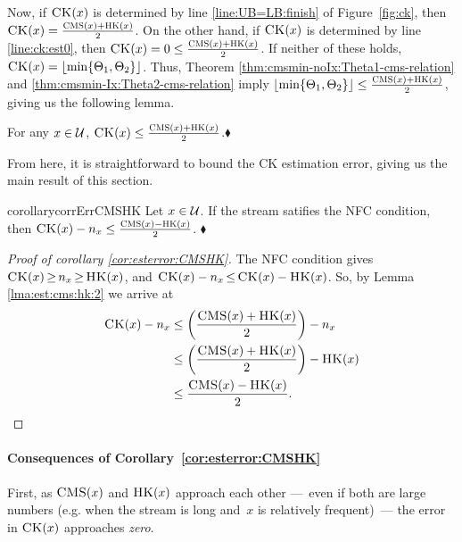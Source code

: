 \noindent
Now, if $\textnormal{\textsc{CK}}(x)$ is determined by line \ref{line:UB=LB:finish} of Figure~\ref{fig:ck}, then $\textnormal{\textsc{CK}}(x) = \frac{\textnormal{\textsc{CMS}}(x) + \textnormal{\textsc{HK}}(x)}{2}$.  On the other hand, if $\textnormal{\textsc{CK}}(x)$ is determined by line \ref{line:ck:est0}, then
$\textnormal{\textsc{CK}}(x)= 0 \leq \frac{\textnormal{\textsc{CMS}}(x) + \textnormal{\textsc{HK}}(x)}{2}$.  If neither of these holds, $\CK(x)=\floor(\min \{\Theta_1, \Theta_2\})$. Thus, Theorem \ref{thm:cmsmin-noIx:Theta1-cms-relation} and \ref{thm:cmsmin-Ix:Theta2-cms-relation} imply 
$\floor(\min \{\Theta_1, \Theta_2\}) \leq \frac{\CMS(x) + \HK(x)}{2}$, giving us the following lemma.
\begin{lemma}\label{lma:est:cms:hk:2}For any $x \in \mathcal{U}$, $\textnormal{\textsc{CK}}(x) \leq \frac{\textnormal{\textsc{CMS}}(x) + \textnormal{\textsc{HK}}(x)}{2}$.\hfill$\blacklozenge$
\end{lemma}

\noindent
From here, it is straightforward to bound the CK estimation error, giving us the main result of this section. 
\begin{restatable}{corollary}{corrErrCMSHK}\label{cor:esterror:CMSHK}
	Let $x \in \mathcal{U}$.  If the stream satifies the NFC condition, then $\textnormal{\textsc{CK}}(x) - n_x \leq \frac{\textnormal{\textsc{CMS}}(x) - \textnormal{\textsc{HK}}(x)}{2}$. \hfill$\blacklozenge$
\end{restatable}

\begin{proof}[Proof of corollary \ref{cor:esterror:CMSHK}]
	The NFC condition gives $\textnormal{\textsc{CK}}(x)  \,{\geq}\,  n_x \,{\geq}\,  \textnormal{\textsc{HK}}(x)$, and
	$\textnormal{\textsc{CK}}(x) - n_x \,{\leq}\, \textnormal{\textsc{CK}}(x)- \textnormal{\textsc{HK}}(x)$. So, by Lemma \ref{lma:est:cms:hk:2} we arrive at
\begin{align*}
	\textnormal{\textsc{CK}}(x) - n_x &\leq \left(\frac{\textnormal{\textsc{CMS}}(x) + \textnormal{\textsc{HK}}(x)}{2}\right) - n_x \\
		&\leq \left(\frac{\textnormal{\textsc{CMS}}(x) + \textnormal{\textsc{HK}}(x)}{2}\right) - \textnormal{\textsc{HK}}(x)\\
	&\leq \frac{\textnormal{\textsc{CMS}}(x) - \textnormal{\textsc{HK}}(x)}{2}.
\end{align*}
\end{proof}


\paragraph{Consequences of Corollary~\ref{cor:esterror:CMSHK}}
First, as $\textnormal{\textsc{CMS}}(x)$ and $\textnormal{\textsc{HK}}(x)$ approach each other ---~even if both are large numbers (e.g. when the stream is long and~$x$ is relatively frequent)~--- the error in $\textnormal{\textsc{CK}}(x)$ approaches \emph{zero}.

